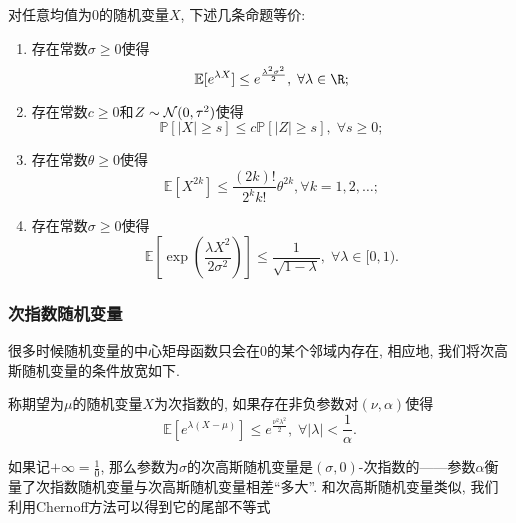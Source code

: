 \begin{theorem}[次高斯随机变量定义的等价性]
	对任意均值为$0$的随机变量$X$, 下述几条命题等价: 
	\begin{enumerate}[label=(\Roman*)]
		\item 存在常数$\sigma \geq 0$使得
			\begin{equation*}
				\mathbb{E}[e^{\lambda X} ] \leq e^{\frac{\lambda^2 \sigma^2}{2}},\; \forall \lambda \in \R; 
			\end{equation*}
		\item 存在常数$c \geq 0$和$Z \sim \mathcal{N}(0, \tau^2)$使得
			\begin{equation*}
				\mathbb{P}[|X| \geq s] \leq c \mathbb{P}[|Z| \geq s],\; \forall s \geq 0; 
			\end{equation*}
		\item 存在常数$\theta \geq 0$使得
			\begin{equation*}
				\mathbb{E}[X^{2k}] \leq \frac{(2k)!}{2^k k!} \theta^{2k}, \forall k = 1,2,\dots;
			\end{equation*}
		\item 存在常数$\sigma \geq 0$使得
			\begin{equation*}
				\mathbb{E}\left[ \exp\left(\frac{\lambda X^2}{2 \sigma^2}\right) \right] \leq \frac{1}{\sqrt{1 - \lambda}},\; \forall \lambda \in [0,1).
			\end{equation*}
	\end{enumerate}
\end{theorem}

\subsubsection{次指数随机变量}

很多时候随机变量的中心矩母函数只会在$0$的某个邻域内存在, 相应地, 我们将次高斯随机变量的条件放宽如下. 
\begin{definition}[次指数随机变量]
	称期望为$\mu$的随机变量$X$为次指数的, 如果存在非负参数对$(\nu, \alpha)$使得
	\begin{equation*}
		\mathbb{E}[ e^{\lambda(X - \mu)} ] 
		\leq e^{\frac{\nu^2 \lambda^2}{2}},\; 
		\forall |\lambda| < \frac{1}{\alpha}. 
	\end{equation*}
\end{definition}
\noindent
如果记$+\infty = \frac10$, 那么参数为$\sigma$的次高斯随机变量是$(\sigma, 0)$-次指数的——参数$\alpha$衡量了次指数随机变量与次高斯随机变量相差“多大”. 
和次高斯随机变量类似, 我们利用Chernoff方法可以得到它的尾部不等式


